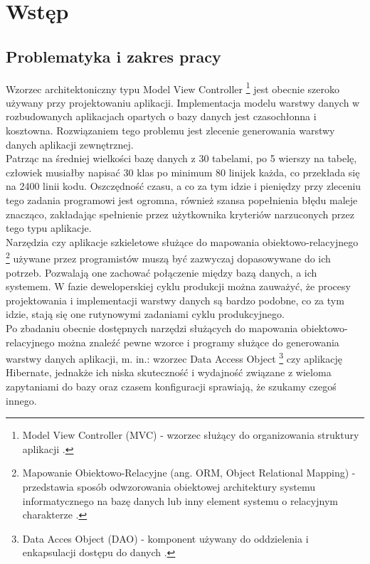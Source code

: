 \documentclass[12pt]{report}
\begin{document}
\tableofcontents	%

\chapter{Wstęp}\label{chap:wstep} 

\section{Problematyka i zakres pracy}
Wzorzec architektoniczny typu Model View Controller
	\footnote{Model View Controller (MVC) - wzorzec służący do organizowania struktury aplikacji \cite{mvc}.}
jest obecnie szeroko używany przy projektowaniu aplikacji. Implementacja modelu warstwy danych w
rozbudowanych aplikacjach opartych o bazy danych jest czasochłonna i kosztowna. Rozwiązaniem tego
problemu jest zlecenie generowania warstwy danych aplikacji zewnętrznej. \\
	\indent Patrząc na średniej wielkości bazę danych z 30 tabelami, po 5 wierszy na tabelę,
człowiek musiałby napisać 30 klas po minimum 80 linijek każda, co przekłada się na 2400 linii kodu. 
Oszczędność czasu, a co za tym idzie i pieniędzy przy zleceniu tego zadania programowi jest ogromna,
również szansa popełnienia błędu maleje znacząco, zakładając spełnienie przez użytkownika
kryteriów narzuconych przez tego typu aplikacje. \\
	\indent Narzędzia czy aplikacje szkieletowe służące do mapowania obiektowo-relacyjnego
	\footnote{Mapowanie Obiektowo-Relacyjne (ang. ORM, Object Relational Mapping) - przedstawia sposób odwzorowania obiektowej architektury
	systemu informatycznego na bazę danych lub inny element systemu o relacyjnym charakterze \cite{hibernateInAction}.}
używane przez programistów muszą być zazwyczaj dopasowywane do ich potrzeb. Pozwalają one zachować połączenie między bazą
danych, a ich systemem. W fazie deweloperskiej cyklu produkcji można zauważyć, że procesy projektowania i implementacji warstwy danych są bardzo podobne, co za tym idzie,
stają się one rutynowymi zadaniami cyklu produkcyjnego. \\
	\indent Po zbadaniu obecnie dostępnych narzędzi służących do mapowania obiektowo-relacyjnego
można znaleźć pewne wzorce i programy służące do generowania warstwy danych aplikacji, m. in.: wzorzec Data Access Object
	\footnote{Data Acces Object (DAO) - komponent używany do oddzielenia i enkapsulacji dostępu do danych \cite{dao}.}
 czy aplikację Hibernate, jednakże ich niska skuteczność i wydajność związane z wieloma zapytaniami do bazy oraz czasem konfiguracji sprawiają, że szukamy czegoś innego.
\end{document}
